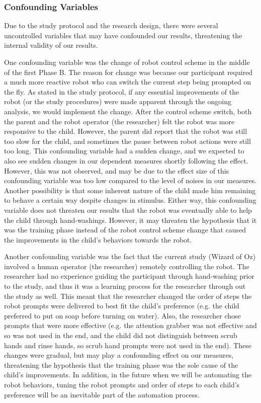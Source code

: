 \subsubsection{Confounding Variables}
Due to the study protocol and the research design, there were several uncontrolled variables that may have confounded our results, threatening the internal validity of our results.

One confounding variable was the change of robot control scheme in the middle of the first Phase B.  The reason for change was because our participant required a much more reactive robot who can switch the current step being prompted on the fly.  As stated in the study protocol, if any essential improvements of the robot (or the study procedures) were made apparent through the ongoing analysis, we would implement the change.  After the control scheme switch, both the parent and the robot operator (the researcher) felt the robot was more responsive to the child.  However, the parent did report that the robot was still too slow for the child, and sometimes the pause between robot actions were still too long.  This confounding variable had a sudden change, and we expected to also see sudden changes in our dependent measures shortly following the effect.  However, this was not observed, and may be due to the effect size of this confounding variable was too low compared to the level of noises in our measures.  Another possibility is that some inherent nature of the child made him remaining to behave a certain way despite changes in stimulus.  Either way, this confounding variable does not threaten our results that the robot was eventually able to help the child through hand-washings.  However, it may threaten the hypothesis that it was the training phase instead of the robot control scheme change that caused the improvements in the child's behaviors towards the robot.

Another confounding variable was the fact that the current study (Wizard of Oz) involved a human operator (the researcher) remotely controlling the robot.  The researcher had no experience guiding the participant through hand-washing prior to the study, and thus it was a learning process for the researcher through out the study as well.  This meant that the researcher changed the order of steps the robot prompts were delivered to best fit the child's preference (e.g. the child preferred to put on soap before turning on water).  Also, the researcher chose prompts that were more effective (e.g. the attention grabber was not effective and so was not used in the end, and the child did not distinguish between scrub hands and rinse hands, so scrub hand prompts were not used in the end).  These changes were gradual, but may play a confounding effect on our measures, threatening the hypothesis that the training phase was the sole cause of the child's improvements.  In addition, in the future when we will be automating the robot behaviors, tuning the robot prompts and order of steps to each child's preference will be an inevitable part of the automation process.

